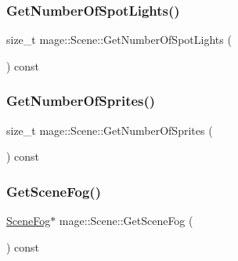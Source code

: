 \hypertarget{classmage_1_1_scene_af7bdbd447a50beb83ae5573f7e5505db}{}\label{classmage_1_1_scene_af7bdbd447a50beb83ae5573f7e5505db} 
\subsubsection{\texorpdfstring{Get\+Number\+Of\+Spot\+Lights()}{GetNumberOfSpotLights()}}
{\footnotesize\ttfamily size\+\_\+t mage\+::\+Scene\+::\+Get\+Number\+Of\+Spot\+Lights (\begin{DoxyParamCaption}{ }\end{DoxyParamCaption}) const\hspace{0.3cm}{\ttfamily [noexcept]}}

\hypertarget{classmage_1_1_scene_a124042421abfee563342e50032d4051f}{}\label{classmage_1_1_scene_a124042421abfee563342e50032d4051f} 
\subsubsection{\texorpdfstring{Get\+Number\+Of\+Sprites()}{GetNumberOfSprites()}}
{\footnotesize\ttfamily size\+\_\+t mage\+::\+Scene\+::\+Get\+Number\+Of\+Sprites (\begin{DoxyParamCaption}{ }\end{DoxyParamCaption}) const\hspace{0.3cm}{\ttfamily [noexcept]}}

\hypertarget{classmage_1_1_scene_a1f21d92feb659477ceb4642322fa2f0c}{}\label{classmage_1_1_scene_a1f21d92feb659477ceb4642322fa2f0c} 
\subsubsection{\texorpdfstring{Get\+Scene\+Fog()}{GetSceneFog()}}
{\footnotesize\ttfamily \hyperlink{structmage_1_1_scene_fog}{Scene\+Fog}$\ast$ mage\+::\+Scene\+::\+Get\+Scene\+Fog (\begin{DoxyParamCaption}{ }\end{DoxyParamCaption}) const\hspace{0.3cm}{\ttfamily [noexcept]}}

